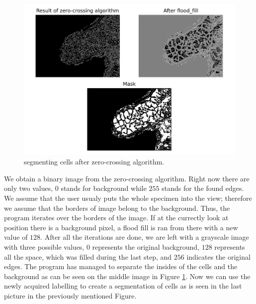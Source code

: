 \documentclass[
  digital,     %
  oneside,     %
  nosansbold,  %
  nocolorbold, %
  lof,         %
  lot,         %
]{fithesis4}
\begin{document}
\begin{figure}
    \begin{center}
        \includegraphics[width=\linewidth]{resources/flood_fill.png}
    \end{center}
    \caption{segmenting cells after zero-crossing algorithm.}
    \label{fig:flood_fill}
\end{figure}

We obtain a binary image from the zero-crossing algorithm. Right now there are
only two values, $0$ stands for background while $255$ stands for the found
edges. We assume that the user usualy puts the whole specimen into the view;
therefore we assume that the borders of image belong to the background. Thus,
the program iterates over the borders of the image. If at the currectly look at
position there is a background pixel, a flood fill is ran from there with a new
value of $128$. After all the iterations are done, we are left with a grayscale
image with three possible values, $0$ represents the original background, $128$
represents all the space, which was filled during the last step, and $256$
indicates the original edges. The program has managed to separate the insides of
the cells and the background as can be seen on the middle image in Figure
\ref{fig:flood_fill}. Now we can use the newly acquired labelling to create a
segmentation of cells as is seen in the last picture in the previously mentioned
Figure.
\end{document}
